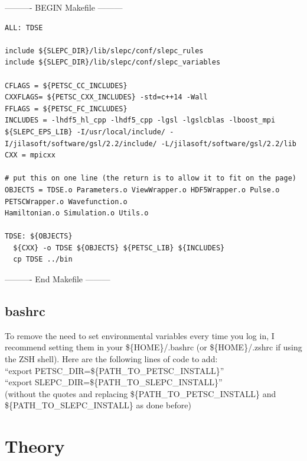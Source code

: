 \documentclass{article}
\begin{document}
---------- BEGIN Makefile ---------
\begin{verbatim}
ALL: TDSE

include ${SLEPC_DIR}/lib/slepc/conf/slepc_rules
include ${SLEPC_DIR}/lib/slepc/conf/slepc_variables

CFLAGS = ${PETSC_CC_INCLUDES}
CXXFLAGS= ${PETSC_CXX_INCLUDES} -std=c++14 -Wall 
FFLAGS = ${PETSC_FC_INCLUDES}
INCLUDES = -lhdf5_hl_cpp -lhdf5_cpp -lgsl -lgslcblas -lboost_mpi ${SLEPC_EPS_LIB} -I/usr/local/include/ -I/jilasoft/software/gsl/2.2/include/ -L/jilasoft/software/gsl/2.2/lib
CXX = mpicxx

# put this on one line (the return is to allow it to fit on the page)
OBJECTS = TDSE.o Parameters.o ViewWrapper.o HDF5Wrapper.o Pulse.o PETSCWrapper.o Wavefunction.o 
Hamiltonian.o Simulation.o Utils.o

TDSE: ${OBJECTS}
  ${CXX} -o TDSE ${OBJECTS} ${PETSC_LIB} ${INCLUDES}
  cp TDSE ../bin
\end{verbatim}
---------- End Makefile ---------

\subsection{bashrc} %
\label{sub:bashrc}
To remove the need to set environmental variables every time you log in, I recommend setting them in your \$\{HOME\}/.bashrc (or \$\{HOME\}/.zshrc if using the ZSH shell). Here are the following lines of code to add: 
\\``export PETSC\_DIR=\$\{PATH\_TO\_PETSC\_INSTALL\}''
\\``export SLEPC\_DIR=\$\{PATH\_TO\_SLEPC\_INSTALL\}''
\\(without the quotes and replacing \$\{PATH\_TO\_PETSC\_INSTALL\} and \$\{PATH\_TO\_SLEPC\_INSTALL\} as done before)



\section{Theory} %
\label{sec:theory}
\end{document}

